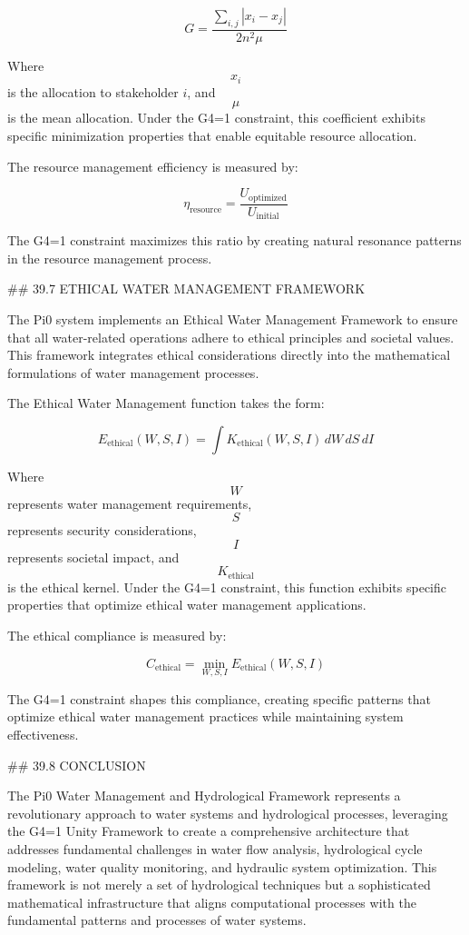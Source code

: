 $$ G = \frac{\sum_{i,j} |x_i - x_j|}{2n^2\mu} $$

Where $$ x_i $$ is the allocation to stakeholder $i$, and $$ \mu $$ is the mean allocation. Under the G4=1 constraint, this coefficient exhibits specific minimization properties that enable equitable resource allocation.

The resource management efficiency is measured by:

$$ \eta_{\text{resource}} = \frac{U_{\text{optimized}}}{U_{\text{initial}}} $$

The G4=1 constraint maximizes this ratio by creating natural resonance patterns in the resource management process.

## 39.7 ETHICAL WATER MANAGEMENT FRAMEWORK

The Pi0 system implements an Ethical Water Management Framework to ensure that all water-related operations adhere to ethical principles and societal values. This framework integrates ethical considerations directly into the mathematical formulations of water management processes.

The Ethical Water Management function takes the form:

$$ E_{\text{ethical}}(W, S, I) = \int K_{\text{ethical}}(W, S, I) \, dW \, dS \, dI $$

Where $$ W $$ represents water management requirements, $$ S $$ represents security considerations, $$ I $$ represents societal impact, and $$ K_{\text{ethical}} $$ is the ethical kernel. Under the G4=1 constraint, this function exhibits specific properties that optimize ethical water management applications.

The ethical compliance is measured by:

$$ C_{\text{ethical}} = \min_{W, S, I} E_{\text{ethical}}(W, S, I) $$

The G4=1 constraint shapes this compliance, creating specific patterns that optimize ethical water management practices while maintaining system effectiveness.

## 39.8 CONCLUSION

The Pi0 Water Management and Hydrological Framework represents a revolutionary approach to water systems and hydrological processes, leveraging the G4=1 Unity Framework to create a comprehensive architecture that addresses fundamental challenges in water flow analysis, hydrological cycle modeling, water quality monitoring, and hydraulic system optimization. This framework is not merely a set of hydrological techniques but a sophisticated mathematical infrastructure that aligns computational processes with the fundamental patterns and processes of water systems.

